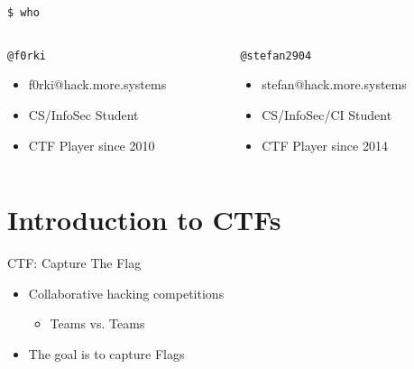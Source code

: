 {
\begin{frame}[t,plain]
    \titlepage
\end{frame}
}

\begin{frame}
  {\texttt{\$ who}}

  \begin{columns}
    \begin{column}{0.48\textwidth}
      {\texttt{@f0rki}}
      \begin{itemize}
        \item f0rki@hack.more.systems
        \item CS/InfoSec Student
        \item CTF Player since 2010
      \end{itemize}
    \end{column}

    \begin{column}{0.48\textwidth}
      \texttt{@stefan2904}
      \begin{itemize}
        \item stefan@hack.more.systems
        \item CS/InfoSec/CI Student
        \item CTF Player since 2014
      \end{itemize}
    \end{column}
  \end{columns}

\end{frame}




\section{Introduction to CTFs}

\begin{frame}[fragile]
  {CTF: Capture The Flag}

  \begin{itemize}
    \item Collaborative hacking competitions
    \begin{itemize}
    	\item Teams vs. Teams
    \end{itemize}
    \item The goal is to capture Flags
  \end{itemize}
\end{frame}



